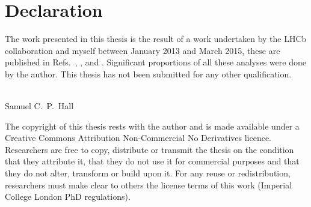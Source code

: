 \clearpage
\chapter*{\centering Declaration}

\begin{center}
  {\setlength{\currentparskip}{\parskip}%
  \begin{minipage}{0.8\textwidth}
    \setlength{\parskip}{\currentparskip}%
    The work presented in this thesis is the result of a work undertaken by the
    LHCb collaboration and myself between January 2013 and March 2015, these are
    published in Refs.~\cite{LHCb-PAPER-2012-025}, \cite{LHCb-PAPER-2014-030}, and \cite{DB}.
    Significant proportions of all these analyses were done by the author.
    This thesis has not been submitted for any other qualification.
    \\\\
    \begin{flushright}
      Samuel C.~P.~Hall\\
      \shortdate
    \end{flushright}
  \end{minipage}

    \vfill

  \begin{minipage}{0.8\textwidth}
    \footnotesize
    The copyright of this thesis rests with the author and is made available under a Creative
    Commons Attribution Non-Commercial No Derivatives licence. Researchers are free to copy,
    distribute or transmit the thesis on the condition that they attribute it, that they do not use
    it for commercial purposes and that they do not alter, transform or build upon it. For any
    reuse or redistribution, researchers must make clear to others the license terms of this work
    (Imperial College London PhD regulations).
  \end{minipage}}
  \vspace{1.0cm}
\end{center}
